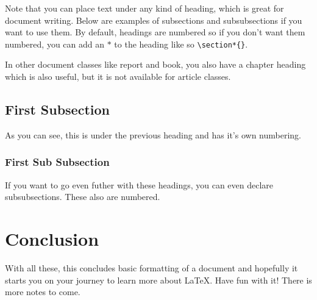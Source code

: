 \documentclass[12pt, a4paper]{article}
\begin{document}
		Note that you can place text under any kind of heading, which is great for document writing. Below are examples of subsections and subsubsections if you want to use them. By default, headings are numbered so if you don't want them numbered, you can add an $*$ to the heading like so \verb|\section*{}|.
		
		In other document classes like report and book, you also have a chapter heading which is also useful, but it is not available for article classes.
		
		\subsection{First Subsection}
			As you can see, this is under the previous heading and has it's own numbering.
			
			\subsubsection{First Sub Subsection}
				If you want to go even futher with these headings, you can even declare subsubsections. These also are numbered.
				
	\section{Conclusion}
		With all these, this concludes basic formatting of a document and hopefully it starts you on your journey to learn more about \LaTeX . Have fun with it! There is more notes to come.


\end{document}
